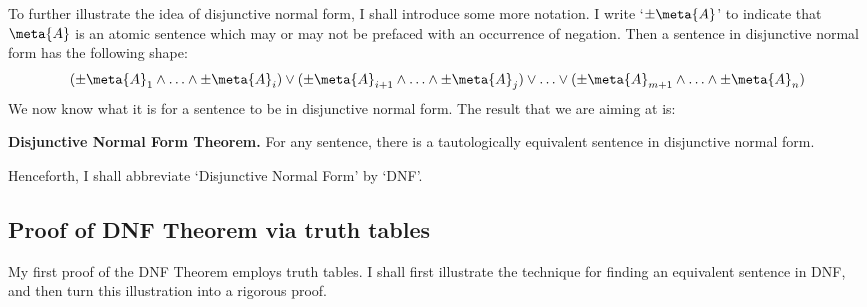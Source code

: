 To further illustrate the idea of disjunctive normal form, I shall introduce some more notation. I write `$\pm\meta{A}$' to indicate that $\meta{A}$ is an atomic sentence which may or may not be prefaced with an occurrence of negation. Then a sentence in disjunctive normal form has the following shape:
	$$(\pm \meta{A}_1 \land \ldots \land \pm \meta{A}_i) \lor (\pm \meta{A}_{i+1} \land \ldots \land \pm\meta{A}_j) \lor \ldots \lor (\pm\meta{A}_{m+1} \land \ldots \land \pm \meta{A}_n)$$
We now know what it is for a sentence to be in disjunctive normal form. The result that we are aiming at is:
	\begin{thm}\label{thm:dnf}\textbf{Disjunctive Normal Form Theorem.} For any sentence, there is a tautologically equivalent sentence in disjunctive normal form.
	\end{thm}\noindent 
Henceforth, I shall abbreviate `Disjunctive Normal Form' by `DNF'. 


\subsection{Proof of DNF Theorem via truth tables}\label{s:DNFTruthTable}
My first proof of the DNF Theorem employs truth tables. I shall first illustrate the technique for finding an equivalent sentence in DNF, and then turn this illustration into a rigorous proof. 

